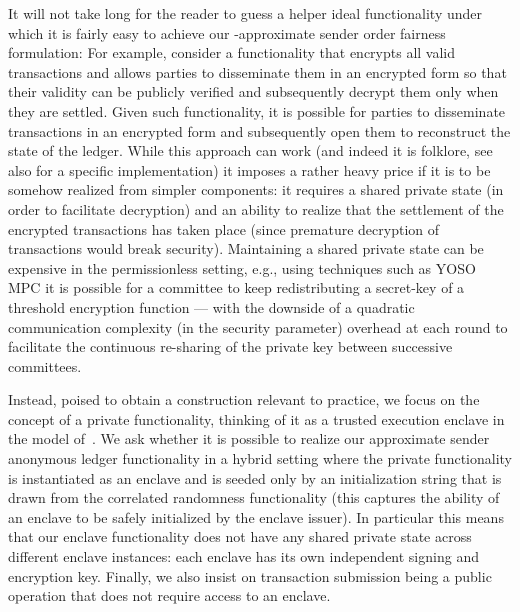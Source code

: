 It will not take long for the reader to guess a helper ideal functionality under which it is fairly easy to achieve our \delay-approximate sender order fairness formulation:
%
For example, consider a functionality that encrypts all valid transactions and allows parties to disseminate them in an encrypted form so that their validity can be publicly verified and subsequently decrypt them only when they are settled.
%
Given such functionality, it is possible for parties to disseminate transactions in an encrypted form and subsequently open them to reconstruct the state of the ledger.
%
While this approach can work (and indeed it is folklore, see also \cite{TOKENOMICS:MalSza23} for a specific implementation) it imposes a rather heavy price if it is to be somehow realized from simpler components: it requires a shared private state (in order to facilitate decryption) and an ability to realize that the settlement of the encrypted transactions has taken place (since premature decryption of transactions would break security).
%
Maintaining a shared private state can be expensive in the permissionless setting, e.g., using techniques such as YOSO MPC \cite{TCC:BGGHKL20} it is possible for a committee to keep redistributing a secret-key of a threshold encryption function --- with the downside of a quadratic communication complexity (in the security parameter) overhead at each round to facilitate the continuous re-sharing of the private key between successive committees.

Instead, poised to obtain a construction relevant to practice, we focus on the concept of a private functionality, thinking of it as a trusted execution enclave in the model of~\cite{EC:PasShiTra17}.
%
We ask whether it is possible to realize our approximate sender anonymous ledger functionality in a hybrid setting where the private functionality is instantiated as an enclave and is seeded only by an initialization string that is drawn from the correlated randomness functionality (this captures the ability of an enclave to be safely initialized by the enclave issuer).
%
In particular this means that our enclave functionality does not have any shared private state across different enclave instances: each enclave has its own independent signing and encryption key.
%
Finally, we also insist on transaction submission being a public operation that does not require access to an enclave.

